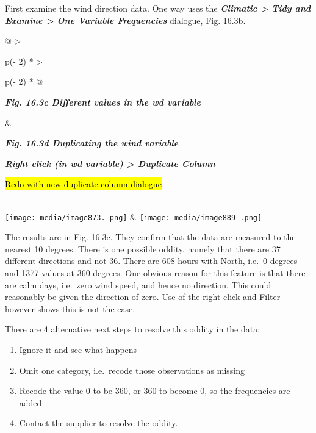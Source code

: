 \documentclass[
  letterpaper,
  DIV=11,
  numbers=noendperiod]{scrreprt}
\begin{document}
First examine the wind direction data. One way uses the
\textbf{\emph{Climatic \textgreater{} Tidy and Examine \textgreater{}
One Variable Frequencies}} dialogue, Fig. 16.3b.

\begin{longtable}[]{@{}
  >{\raggedright\arraybackslash}p{(\columnwidth - 2\tabcolsep) * }
  >{\raggedright\arraybackslash}p{(\columnwidth - 2\tabcolsep) * }@{}}
\toprule\noalign{}
\begin{minipage}[b]{\linewidth}\raggedright
\textbf{\emph{Fig. 16.3c Different values in the wd variable}}
\end{minipage} & \begin{minipage}[b]{\linewidth}\raggedright
\textbf{\emph{Fig. 16.3d Duplicating the wind variable}}

\textbf{\emph{Right click (in wd variable) \textgreater{} Duplicate
Column}}

\hl{Redo with new duplicate column dialogue}
\end{minipage} \\
\midrule\noalign{}
\endhead
\bottomrule\noalign{}
\endlastfoot
\texttt{[image: media/image873. png]}
&
\texttt{[image: media/image889 .png]} \\
\end{longtable}

The results are in Fig. 16.3c. They confirm that the data are measured
to the nearest 10 degrees. There is one possible oddity, namely that
there are 37 different directions and not 36. There are 608 hours with
North, i.e.~0 degrees and 1377 values at 360 degrees. One obvious reason
for this feature is that there are calm days, i.e.~zero wind speed, and
hence no direction. This could reasonably be given the direction of
zero. Use of the right-click and Filter however shows this is not the
case.

There are 4 alternative next steps to resolve this oddity in the data:

\begin{enumerate}
\def\labelenumi{\arabic{enumi}.}
\item
  Ignore it and see what happens
\item
  Omit one category, i.e.~recode those observations as missing
\item
  Recode the value 0 to be 360, or 360 to become 0, so the frequencies
  are added
\item
  Contact the supplier to resolve the oddity.
\end{enumerate}
\end{document}
